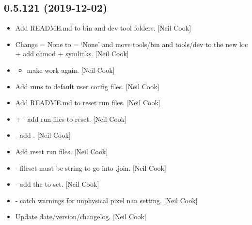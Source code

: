 \documentclass[a4paper,10pt,english]{report}
\begin{document}
\subsection{0.5.121 (2019-12-02)}
\label{\detokenize{misc/changelog:id22}}\begin{itemize}
\item {} 
Add README.md to bin and dev tool folders. {[}Neil Cook{]}

\item {} 
Change  = None to  = ‘None’ and move
tools/bin and tools/dev to the new loc + add chmod + symlinks. {[}Neil
Cook{]}

\item {} \begin{itemize}
\item {} 
make  work again. {[}Neil Cook{]}

\end{itemize}

\item {} 
Add runs to default user config files. {[}Neil Cook{]}

\item {} 
Add README.md to reset run files. {[}Neil Cook{]}

\item {} 
 +  - add run files to reset. {[}Neil
Cook{]}

\item {} 
 - add . {[}Neil
Cook{]}

\item {} 
Add reset run files. {[}Neil Cook{]}

\item {} 
 - fileset must be string to go
into .join. {[}Neil Cook{]}

\item {} 
 - add the  to
 set. {[}Neil Cook{]}

\item {} 
 - catch warnings for unphysical pixel nan
setting. {[}Neil Cook{]}

\item {} 
Update date/version/changelog. {[}Neil Cook{]}

\end{itemize}
\end{document}
